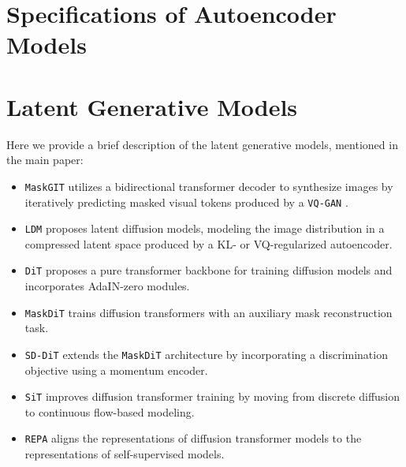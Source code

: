 



\clearpage

\section{Specifications of Autoencoder Models}
\label{sec:appendix:ae_specs}


\section{Latent Generative Models}

Here we provide a brief description of the latent generative models, mentioned in the main paper:
\begin{itemize}[noitemsep, topsep=5pt]
    \item \texttt{MaskGIT} \cite{chang2022maskgit} utilizes a bidirectional transformer decoder to synthesize images by iteratively predicting masked visual tokens produced by a \texttt{VQ-GAN} \cite{esser2021taming}.
    
    \item \texttt{LDM} \cite{rombach2022high} proposes latent diffusion models, modeling the image distribution in a compressed latent space produced by a KL- or VQ-regularized autoencoder.

    \item \texttt{DiT} \cite{yao2024fasterdit} proposes a pure transformer backbone for training diffusion models and incorporates AdaIN-zero modules.

    \item \texttt{MaskDiT} \cite{zheng2023fast} trains diffusion transformers with an auxiliary mask reconstruction task.

    \item \texttt{SD-DiT} \cite{zhu2024sd} extends the \texttt{MaskDiT} architecture by incorporating a discrimination objective using a momentum encoder.

    \item \texttt{SiT} \cite{ma2024sit} improves diffusion transformer training by moving from discrete diffusion to continuous flow-based modeling.

    \item \texttt{REPA} \cite{Yu2025repa} aligns the representations of diffusion transformer models to the representations of self-supervised models.
\end{itemize}

